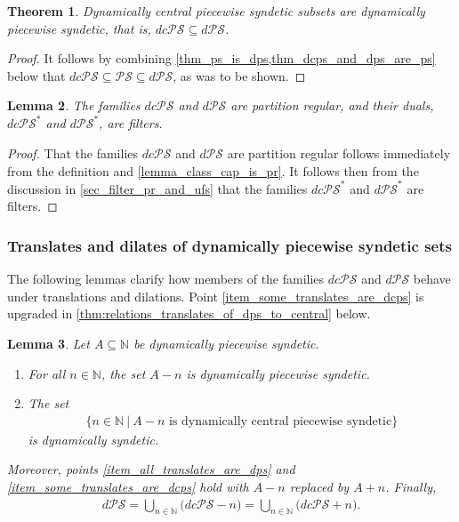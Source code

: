 \documentclass[letter,11pt]{article}
\theoremstyle{plain}
\newtheorem{theorem}{Theorem}
\newtheorem{lemma}[theorem]{Lemma}
\theoremstyle{definition}
\theoremstyle{plain}
\theoremstyle{plain}
\numberwithin{equation}{section}
\newcommand{\N}{\mathbb{N}}
\newcommand{\PS}{\mathcal{PS}}
\newcommand{\dPS}{d\mathcal{PS}}
\newcommand{\dcPS}{dc\mathcal{PS}}
\begin{document}
\begin{theorem}
\label{lemma_basic_results}
    Dynamically central piecewise syndetic subsets are dynamically piecewise syndetic, that is, $\dcPS \subseteq \dPS$.
\end{theorem}

\begin{proof}
    It follows by combining \cref{thm_ps_is_dps,thm_dcps_and_dps_are_ps} below that $\dcPS \subseteq \PS \subseteq \dPS$, as was to be shown.
\end{proof}

\begin{lemma}
\label{lemma_dcps_dps_are_pr}
    The families $\dcPS$ and $\dPS$ are partition regular, and their duals, $\dcPS^*$ and $\dPS^*$, are filters.
\end{lemma}

\begin{proof}
    That the families $\dcPS$ and $\dPS$ are partition regular follows immediately from the definition and \cref{lemma_class_cap_is_pr}.  It follows then from the discussion in \cref{sec_filter_pr_and_ufs} that the families $\dcPS^*$ and $\dPS^*$ are filters.
\end{proof}



\subsubsection{Translates and dilates of dynamically piecewise syndetic sets}

The following lemmas clarify how members of the families $\dcPS$ and $\dPS$ behave under translations and dilations.  Point \eqref{item_some_translates_are_dcps} is upgraded in \cref{thm:relations_translates_of_dps_to_central} below.

\begin{lemma}
\label{lemma_translates_of_dps_sets}
    Let $A \subseteq \N$ be dynamically piecewise syndetic.
    \begin{enumerate}        
        \item
        \label{item_all_translates_are_dps}
        For all $n \in \N$, the set $A-n$ is dynamically piecewise syndetic.
        
        \item
        \label{item_some_translates_are_dcps}
        The set
        \begin{align}
            \label{eqn_translates_of_dps_set}
            \big\{ n \in \N \ \big| \ A-n \text{ is dynamically central piecewise syndetic} \big\}
        \end{align}
        is dynamically syndetic.
    \end{enumerate}
    Moreover, points \eqref{item_all_translates_are_dps} and \eqref{item_some_translates_are_dcps} hold with $A-n$ replaced by $A+n$. Finally,
    \begin{align}
        \label{eqn_relationship_between_dps_and_dcps_classes}
        \dPS = \bigcup_{n \in \N} \big(\dcPS - n \big) = \bigcup_{n \in \N} \big(\dcPS + n \big).
    \end{align}
\end{lemma}
\end{document}
